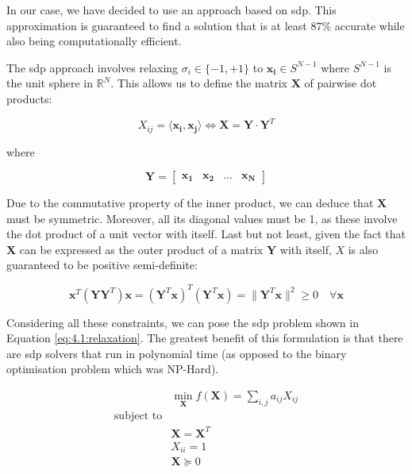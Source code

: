 \documentclass[../main.tex]{subfiles}
\begin{document}
In our case, we have decided to use an approach based on \gls{sdp}. This approximation is guaranteed to find a solution that is at least $87 \si{\percent}$ accurate while also being computationally efficient\cite{kemal2008}.

The \gls{sdp} approach involves relaxing $\sigma_i \in \{-1, +1\}$ to $\bm{x_i} \in S^{N-1}$ where $S^{N-1}$ is the unit sphere in $\mathbb{R}^N$. This allows us to define the matrix $\bm{X}$ of pairwise dot products:

\begin{equation}
    X_{ij} = \langle \bm{x_i}, \bm{x_j} \rangle \Leftrightarrow \bm{X} = \bm{Y} \cdot \bm{Y}^T
\end{equation}

where

\begin{equation}
    \bm{Y} =
    \begin{bmatrix}
        \bm{x_1} & \bm{x_2} & \dots & \bm{x_N}
    \end{bmatrix}
\end{equation}

Due to the commutative property of the inner product, we can deduce that $\bm{X}$ must be symmetric. Moreover, all its diagonal values must be 1, as these involve the dot product of a unit vector with itself. Last but not least, given the fact that $\bm{X}$ can be expressed as the outer product of a matrix $\bm{Y}$ with itself, $X$ is also guaranteed to be positive semi-definite: 

\begin{equation}
    \bm{x}^T (\bm{Y} \bm{Y}^T) \bm{x} = (\bm{Y}^T \bm{x})^T (\bm{Y}^T \bm{x}) = \lVert \bm{Y}^T \bm{x} \rVert^2 \geq 0 \quad \forall \bm{x}
\end{equation}

Considering all these constraints, we can pose the \gls{sdp} problem shown in Equation \eqref{eq:4.1:relaxation}. The greatest benefit of this formulation is that there are \gls{sdp} solvers that run in polynomial time (as opposed to the binary optimisation problem which was NP-Hard).

\begin{equation}\label{eq:4.1:relaxation}
\begin{aligned}
    & \min_{\bm{X}} f(\bm{X}) = \sum_{i,j} a_{ij}X_{ij}\\
    \text{subject to}\\
    & \bm{X} = \bm{X}^T\\
    & X_{ii} = 1\\
    & \bm{X} \succeq 0
\end{aligned}
\end{equation}
\end{document}
